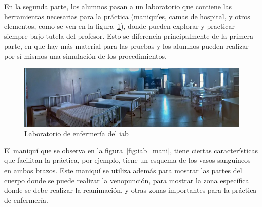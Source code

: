 En la segunda parte, los alumnos pasan a un laboratorio que contiene las
herramientas necesarias para la práctica (maniquíes, camas de hospital, y otros
elementos, como se ven en la figura~\ref{fig:iab_lab}), donde pueden explorar y
practicar siempre bajo tutela del profesor. Esto se diferencia
principalmente de la primera parte, en que hay más material para las pruebas y los
alumnos pueden realizar por sí mismos una simulación de los procedimientos.

\begin{figure}[h!t] 
\centering 
\includegraphics[scale=0.3,natwidth=100,natheight=100]{problema/iab_sala_1.jpg}
\caption{Laboratorio de enfermería del \Gls{iab}}
\label{fig:iab_lab}
\end{figure}


El maniquí que se observa en la figura~\ref{fig:iab_mani}, tiene ciertas
características que facilitan la práctica, por ejemplo, tiene un esquema de los
vasos sanguíneos en ambos brazos. Este maniquí se utiliza además para mostrar
las partes del cuerpo donde se puede realizar la venopunción, para mostrar la
zona específica donde se debe realizar la reanimación, y otras zonas importantes
para la práctica de enfermería.


